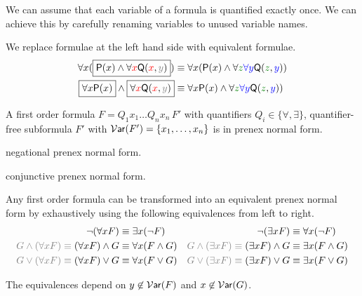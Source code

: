
\noindent We can assume that each variable of a formula is quantified exactly once. 
We can achieve this by carefully renaming variables to unused variable names.

\begin{example}We replace formulae at the left hand side with equivalent formulae.
	\begin{align*}
	\forall x (\boxed{\mP(x) \land \forall {\colLo x} \mQ({\colLo x}, {\colG y})}) 
	&\equiv 
	\forall x (\mP(x) \land \forall {\colHi z}{\colN \forall y} \mQ({\colHi z}, {\colN y}))
	\\
	\boxed{\forall x \mP(x)} \land \boxed{\forall {\colLo x} \mQ({\colLo x}, {\colG y})} 
	&\equiv 
	\forall x \mP(x) \land \forall {\colHi z}{\colN \forall y} \mQ({\colHi z}, {\colN y}) 
	)\\
	\end{align*}
\end{example}

\begin{definition}\label{def:syntax:PNF}
	A first order formula $F = Q_1 x_1 \ldots Q_n x_n\, F'$ 
	with quantifiers $Q_i\in\{\forall,\exists\}$, 
	quantifier-free subformula $F'$ with $\operatorname{\mathcal{V}\mathsf{ar}}(F') = \{ x_1,\ldots,x_n \}$
	is in {\myem prenex normal form}.
\end{definition}

\begin{definition}\label{def:syntax:PNF}
	{\myem negational prenex normal form}.
\end{definition}

\begin{definition}\label{def:syntax:PNF}
	{\myem conjunctive prenex normal form}.
\end{definition}

\begin{lemma}
	Any first order formula can be transformed 
	into an equivalent prenex normal form 
	by exhaustively using the following equivalences from left to right.
	\begin{align*}
	\lnot(\forall x F) &\equiv \exists x (\lnot F)
	&
	\lnot(\exists x F) &\equiv \forall x (\lnot F)
	\\
	{\colG G \land (\forall x F) \equiv{}} (\forall x F) \land G &\equiv \forall x (F \land G)  
	&
	{\colG G \land (\exists x F) \equiv{}} (\exists x F) \land G &\equiv \exists x (F \land G)  
	\\
	{\colG G \lor (\forall x F) \equiv{}} (\forall x F) \lor G &\equiv \forall x (F \lor G) 
	&
	{\colG G \lor (\exists x F) \equiv{}} (\exists x F) \lor G &\equiv \exists x (F \lor G)
	\end{align*}
	\begin{remark}
		The equivalences depend on $y\not\in\operatorname{\mathcal{V}\mathsf{ar}}(F)$ and $x\not\in\operatorname{\mathcal{V}\mathsf{ar}}(G)$.
	\end{remark}
\end{lemma}

